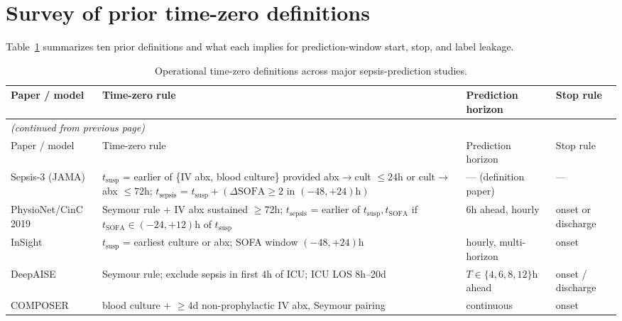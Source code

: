 \documentclass[11pt]{article}
\begin{document}
\section{Survey of prior time-zero definitions}
\label{sec:survey}

Table~\ref{tab:lit} summarizes ten prior definitions and what each
implies for prediction-window start, stop, and label leakage.

\renewcommand{\arraystretch}{1.15}
{\footnotesize
\begin{longtable}{p{2.8cm} p{6.4cm} p{2.6cm} p{3.0cm}}
\caption{Operational time-zero definitions across major sepsis-prediction
studies.}\label{tab:lit}\\
\toprule
Paper / model & Time-zero rule & Prediction horizon & Stop rule \\
\midrule
\endfirsthead

\multicolumn{4}{l}{\textit{(continued from previous page)}}\\
\toprule
Paper / model & Time-zero rule & Prediction horizon & Stop rule \\
\midrule
\endhead

\bottomrule
\endfoot

\citet{seymour2016assessment} Sepsis-3 (JAMA) &
$t_{\text{susp}}$ = earlier of \{IV abx, blood culture\} provided
abx$\to$cult $\le 24$h or cult$\to$abx $\le 72$h; $t_{\text{sepsis}}$ =
$t_{\text{susp}} + (\Delta\text{SOFA}\ge 2 \text{ in } (-48, +24)\text{h})$
& --- (definition paper) & --- \\

\citet{reyna2020physionet} PhysioNet/CinC 2019 &
Seymour rule $+$ IV abx sustained $\ge$72h; $t_{\text{sepsis}}$ =
earlier of $t_{\text{susp}}, t_{\text{SOFA}}$ if
$t_{\text{SOFA}} \in (-24, +12)\text{h}$ of $t_{\text{susp}}$ &
6h ahead, hourly &
onset or discharge \\

\citet{desautels2016insight} InSight &
$t_{\text{susp}}$ = earliest culture or abx; SOFA window
$(-48, +24)\text{h}$ &
hourly, multi-horizon &
onset \\

\citet{shashikumar2021aise} DeepAISE &
Seymour rule; exclude sepsis in first 4h of ICU; ICU LOS 8h--20d &
$T\in\{4,6,8,12\}$h ahead &
onset / discharge \\

\citet{shashikumar2021composer} COMPOSER &
blood culture $+$ $\ge 4$d non-prophylactic IV abx, Seymour pairing &
continuous &
onset \\


\end{longtable}}
\end{document}

